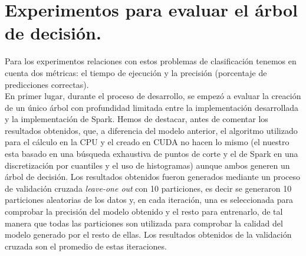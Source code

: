 \newpage
\section{Experimentos para evaluar el árbol de decisión.}
Para los experimentos relaciones con estos problemas de clasificación tenemos en cuenta dos métricas: el tiempo de ejecución y la precisión (porcentaje de predicciones correctas).\\

En primer lugar, durante el proceso de desarrollo, se empezó a evaluar la creación de un único árbol con profundidad limitada entre la implementación desarrollada y la implementación de Spark. Hemos de destacar, antes de comentar los resultados obtenidos, que, a diferencia del modelo anterior, el algoritmo utilizado para el cálculo en la CPU y el creado en CUDA no hacen lo mismo (el nuestro esta basado en una búsqueda exhaustiva de puntos de corte y el de Spark en una discretización por cuantiles y el uso de histogramas) aunque ambos generen un árbol de decisión. Los resultados obtenidos fueron generados mediante un proceso de validación cruzada \textit{leave-one out} con 10 particiones, es decir se generaron 10 particiones aleatorias de los datos y, en cada iteración, una es seleccionada para comprobar la precisión del modelo obtenido y el resto para entrenarlo, de tal manera que todas las particiones son utilizada para comprobar la calidad del modelo generado por el resto de ellas. Los resultados obtenidos de la validación cruzada son el promedio de estas iteraciones.
\newpage
